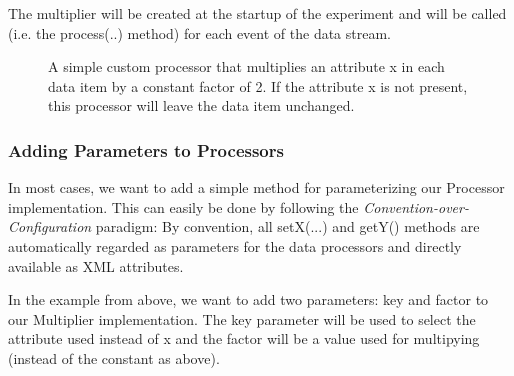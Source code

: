 \begin{figure}[h!]
\end{figure}

The multiplier will be created at the startup of the experiment and
will be called (i.e. the {\ttfamily process(..)} method) for each
event of the data stream.

\begin{figure}[h!]
\caption{\label{fig:multiplyImpl}A simple custom processor that
  multiplies an attribute {\ttfamily x} in each data item by a
  constant factor of 2. If the attribute {\ttfamily x} is not present,
  this processor will leave the data item unchanged.}
\end{figure}


\subsubsection{Adding Parameters to Processors}
In most cases, we want to add a simple method for parameterizing our
Processor implementation. This can easily be done by following the
{\em Convention-over-Configuration} paradigm: By convention, all
{\ttfamily setX(...)} and {\ttfamily getY()} methods are automatically
regarded as parameters for the data processors and directly available
as XML attributes.

In the example from above, we want to add two parameters: {\ttfamily
key} and {\ttfamily factor} to our Multiplier implementation. The
{\ttfamily key} parameter will be used to select the attribute used
instead of {\ttfamily x} and the {\ttfamily factor} will be a value
used for multipying (instead of the constant {} as above).


